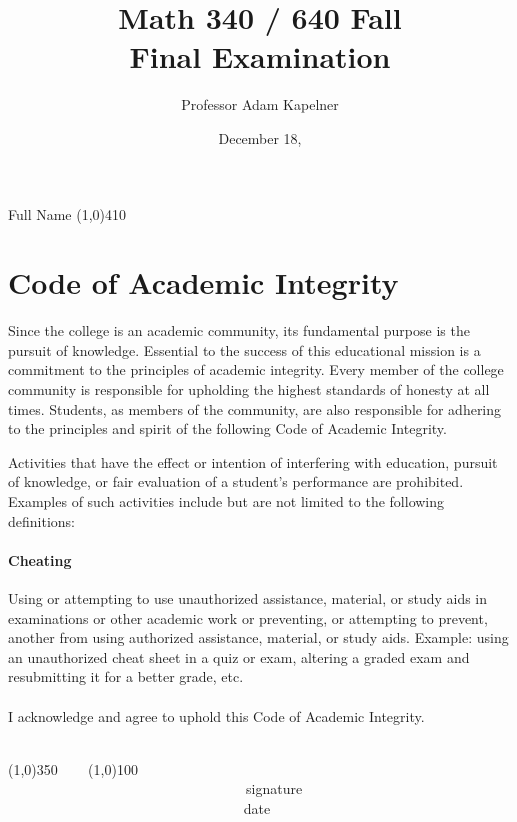 \documentclass[12pt]{article}
\title{Math 340 / 640 Fall \the\year{} \\ Final Examination}
\author{Professor Adam Kapelner}
\date{December 18, \the\year{}}
\begin{document}
\maketitle

\noindent Full Name \line(1,0){410}

\thispagestyle{empty}

\section*{Code of Academic Integrity}

\footnotesize
Since the college is an academic community, its fundamental purpose is the pursuit of knowledge. Essential to the success of this educational mission is a commitment to the principles of academic integrity. Every member of the college community is responsible for upholding the highest standards of honesty at all times. Students, as members of the community, are also responsible for adhering to the principles and spirit of the following Code of Academic Integrity.

Activities that have the effect or intention of interfering with education, pursuit of knowledge, or fair evaluation of a student's performance are prohibited. Examples of such activities include but are not limited to the following definitions:

\paragraph{Cheating} Using or attempting to use unauthorized assistance, material, or study aids in examinations or other academic work or preventing, or attempting to prevent, another from using authorized assistance, material, or study aids. Example: using an unauthorized cheat sheet in a quiz or exam, altering a graded exam and resubmitting it for a better grade, etc.\\
\\
\noindent I acknowledge and agree to uphold this Code of Academic Integrity. \\~\\

\begin{center}
\line(1,0){350} ~~~ \line(1,0){100}\\
~~~~~~~~~~~~~~~~~~~~~~~~~~~~~~~~~~signature~~~~~~~~~~~~~~~~~~~~~~~~~~~~~~~~~~~~~~~~~~~~~~~~~~~~~~~~~~~~~~ date
\end{center}

\normalsize
\end{document}
